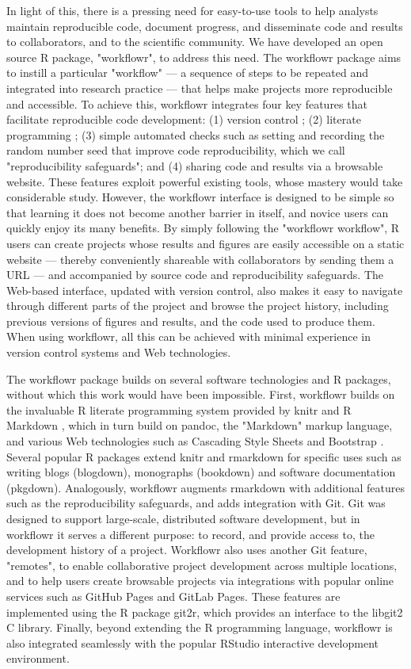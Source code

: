 \documentclass[9pt,a4paper]{extarticle}
\begin{document}
In light of this, there is a pressing need for easy-to-use tools to help
analysts maintain reproducible code, document progress, and disseminate
code and results to collaborators, and to the scientific community. We
have developed an open source R \cite{R2019} package, "workflowr", to
address this need. The workflowr package aims to instill a particular
"workflow" --- a sequence of steps to be repeated and integrated into
research practice --- that helps make projects more reproducible and
accessible. To achieve this, workflowr integrates four key features that
facilitate reproducible code development: (1) version control
\cite{Loeliger2012, Chacon2014}; (2) literate programming
\cite{Xie2018}; (3) simple automated checks such as setting and
recording the random number seed that improve code reproducibility,
which we call "reproducibility safeguards"; and (4) sharing code and
results via a browsable website. These features exploit powerful
existing tools, whose mastery would take considerable study. However,
the workflowr interface is designed to be simple so that learning it
does not become another barrier in itself, and novice users can quickly
enjoy its many benefits. By simply following the "workflowr workflow", R
users can create projects whose results and figures are easily
accessible on a static website --- thereby conveniently shareable with
collaborators by sending them a URL --- and accompanied by source code
and reproducibility safeguards. The Web-based interface, updated with
version control, also makes it easy to navigate through different parts
of the project and browse the project history, including previous
versions of figures and results, and the code used to produce them. When
using workflowr, all this can be achieved with minimal experience in
version control systems and Web technologies.

The workflowr package builds on several software technologies and R
packages, without which this work would have been impossible. First,
workflowr builds on the invaluable R literate programming system
provided by knitr \cite{Xie2014, knitr} and R Markdown \cite{Xie2018,
rmarkdown}, which in turn build on pandoc, the "Markdown" markup
language, and various Web technologies such as Cascading Style Sheets
and Bootstrap \cite{Spurlock2013}. Several popular R packages extend
knitr and rmarkdown for specific uses such as writing blogs (blogdown),
monographs (bookdown) and software documentation (pkgdown). Analogously,
workflowr augments rmarkdown with additional features such as the
reproducibility safeguards, and adds integration with Git. Git was
designed to support large-scale, distributed software development, but
in workflowr it serves a different purpose: to record, and provide
access to, the development history of a project. Workflowr also uses
another Git feature, "remotes", to enable collaborative project
development across multiple locations, and to help users create
browsable projects via integrations with popular online services such as
GitHub Pages and GitLab Pages. These features are implemented using the
R package git2r, which provides an interface to the libgit2 C library.
Finally, beyond extending the R programming language, workflowr is also
integrated seamlessly with the popular RStudio interactive development
environment.
\end{document}
